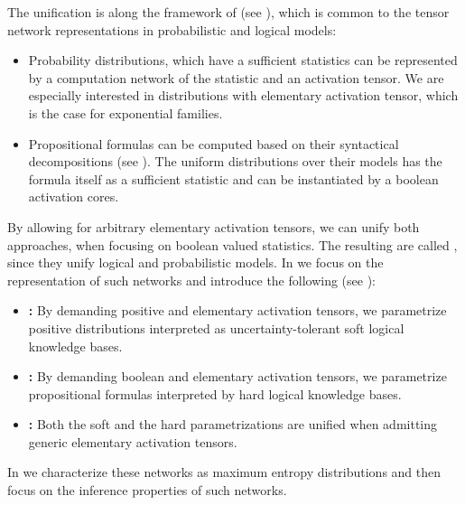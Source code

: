 The unification is along the framework of \ComputationActivationNetworks{} (see ), which is common to the tensor network representations in probabilistic and logical models:
\begin{itemize}
    \item Probability distributions, which have a sufficient statistics can be represented by a computation network of the statistic and an activation tensor.
    We are especially interested in distributions with elementary activation tensor, which is the case for exponential families.
    \item Propositional formulas can be computed based on their syntactical decompositions (see ).
    The uniform distributions over their models has the formula itself as a sufficient statistic and can be instantiated by a boolean activation cores.
\end{itemize}
By allowing for arbitrary elementary activation tensors, we can unify both approaches, when focusing on boolean valued statistics.
The resulting \ComputationActivationNetworks{}are called \HybridLogicNetworks{}, since they unify logical and probabilistic models.
In  we focus on the representation of such networks and introduce the following (see ):
\begin{itemize}
    \item \textbf{\MarkovLogicNetworks{}:} By demanding positive and elementary activation tensors, we parametrize positive distributions interpreted as uncertainty-tolerant soft logical knowledge bases.
    \item \textbf{\HardLogicNetworks{}:} By demanding boolean and elementary activation tensors, we parametrize propositional formulas interpreted by hard logical knowledge bases.
    \item \textbf{\HybridLogicNetworks{}:} Both the soft and the hard parametrizations are unified when admitting generic elementary activation tensors.
\end{itemize}
In  we characterize these networks as maximum entropy distributions and then focus on the inference properties of such networks.

